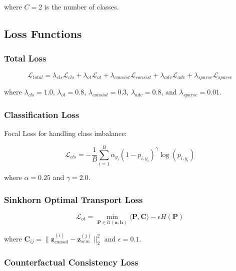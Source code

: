 \documentclass[11pt]{article}
\begin{document}
where $C=2$ is the number of classes.

\subsection{Loss Functions}

\subsubsection{Total Loss}

\begin{equation}
\mathcal{L}_{total} = \lambda_{cls} \mathcal{L}_{cls} + \lambda_{ot} \mathcal{L}_{ot} + \lambda_{consist} \mathcal{L}_{consist} + \lambda_{adv} \mathcal{L}_{adv} + \lambda_{sparse} \mathcal{L}_{sparse}
\end{equation}

where $\lambda_{cls}=1.0$, $\lambda_{ot}=0.8$, $\lambda_{consist}=0.3$, $\lambda_{adv}=0.8$, and $\lambda_{sparse}=0.01$.

\subsubsection{Classification Loss}

Focal Loss for handling class imbalance:

\begin{equation}
\mathcal{L}_{cls} = -\frac{1}{B}\sum_{i=1}^{B} \alpha_{y_i} (1-p_{i,y_i})^{\gamma} \log(p_{i,y_i})
\end{equation}

where $\alpha=0.25$ and $\gamma=2.0$.

\subsubsection{Sinkhorn Optimal Transport Loss}

\begin{equation}
\mathcal{L}_{ot} = \min_{\mathbf{P} \in \mathcal{U}(\mathbf{a}, \mathbf{b})} \langle \mathbf{P}, \mathbf{C} \rangle - \epsilon H(\mathbf{P})
\end{equation}

where $\mathbf{C}_{ij} = \|\mathbf{z}_{causal}^{(i)} - \mathbf{z}_{sem}^{(j)}\|_2^2$ and $\epsilon = 0.1$.

\subsubsection{Counterfactual Consistency Loss}
\end{document}
